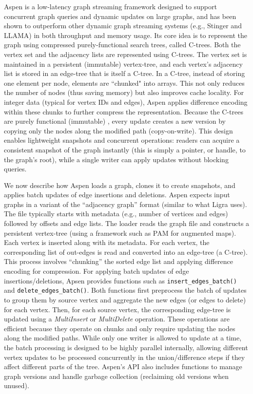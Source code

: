 Aspen \cite{dhulipala2019low} is a low-latency graph streaming framework designed to support concurrent graph queries and dynamic updates on large graphs, and has been shown to outperform other dynamic graph streaming systems (e.g., Stinger and LLAMA) in both throughput and memory usage. Its core idea is to represent the graph using compressed purely-functional search trees, called C-trees. Both the vertex set and the adjacency lists are represented using C-trees. The vertex set is maintained in a persistent (immutable) vertex-tree, and each vertex's adjacency list is stored in an edge-tree that is itself a C-tree. In a C-tree, instead of storing one element per node, elements are ``chunked" into arrays. This not only reduces the number of nodes (thus saving memory) but also improves cache locality. For integer data (typical for vertex IDs and edges), Aspen applies difference encoding within these chunks to further compress the representation. Because the C-trees are purely functional (immutable) \cite{okasaki1998purely}, every update creates a new version by copying only the nodes along the modified path (copy-on-write). This design enables lightweight snapshots and concurrent operations: readers can acquire a consistent snapshot of the graph instantly (this is simply a pointer, or handle, to the graph's root), while a single writer can apply updates without blocking queries.

We now describe how Aspen loads a graph, clones it to create snapshots, and applies batch updates of edge insertions and deletions. Aspen expects input graphs in a variant of the “adjacency graph” format (similar to what Ligra uses). The file typically starts with metadata (e.g., number of vertices and edges) followed by offsets and edge lists. The loader reads the graph file and constructs a persistent vertex-tree (using a framework such as PAM for augmented maps). Each vertex is inserted along with its metadata. For each vertex, the corresponding list of out-edges is read and converted into an edge-tree (a C-tree). This process involves “chunking” the sorted edge list and applying difference encoding for compression. For applying batch updates of edge insertions/deletions, Apsen provides functions such as \texttt{insert\_edges\_batch()} and \texttt{delete\_edges\_batch()}. Both functions first preprocess the batch of updates to group them by source vertex and aggregate the new edges (or edges to delete) for each vertex. Then, for each source vertex, the corresponding edge-tree is updated using a \textit{MultiInsert} or \textit{MultiDelete} operation. These operations are efficient because they operate on chunks and only require updating the nodes along the modified paths. While only one writer is allowed to update at a time, the batch processing is designed to be highly parallel internally, allowing different vertex updates to be processed concurrently in the union/difference steps if they affect different parts of the tree. Aspen's API also includes functions to manage graph versions and handle garbage collection (reclaiming old versions when unused).


